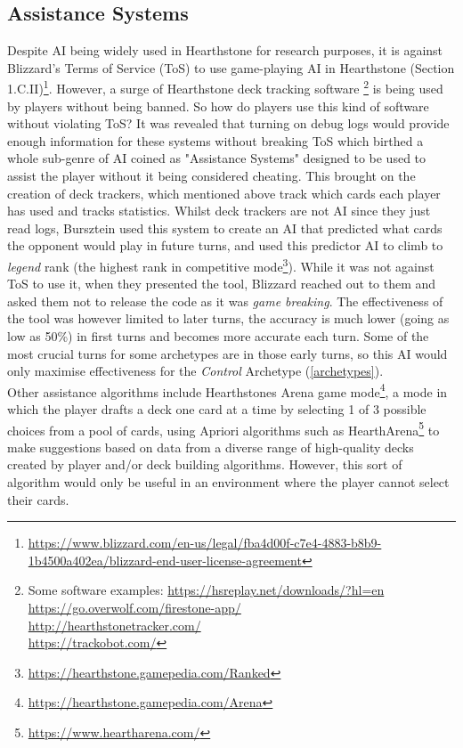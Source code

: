 \documentclass{report} %
\begin{document}
\subsection{Assistance Systems}
Despite AI being widely used in Hearthstone for research purposes, it is against Blizzard's Terms of Service (ToS) to use game-playing AI in Hearthstone (Section 1.C.II)\footnote{\url{https://www.blizzard.com/en-us/legal/fba4d00f-c7e4-4883-b8b9-1b4500a402ea/blizzard-end-user-license-agreement}}. However, a surge of Hearthstone deck tracking software \footnote{Some software examples: \url{https://hsreplay.net/downloads/?hl=en} \\ \url{https://go.overwolf.com/firestone-app/} \\ \url{http://hearthstonetracker.com/}  \\ \url{https://trackobot.com/}} is being used by players without being banned. So how do players use this kind of software without violating ToS? It was revealed that turning on debug logs would provide enough information for these systems without breaking ToS \cite{Flipperbw2014} which birthed a whole sub-genre of AI coined as "Assistance Systems" designed to be used to assist the player without it being considered cheating. This brought on the creation of deck trackers, which mentioned above track which cards each player has used and tracks statistics. Whilst deck trackers are not AI since they just read logs, Bursztein \cite{Bursztein2016} used this system to create an AI that predicted what cards the opponent would play in future turns, and used this predictor AI to climb to \textit{legend} rank (the highest rank in competitive mode\footnote{\url{https://hearthstone.gamepedia.com/Ranked}}). While it was not against ToS to use it, when they presented the tool, Blizzard reached out to them and asked them not to release the code as it was \textit{game breaking}. The effectiveness of the tool was however limited to later turns, the accuracy is much lower (going as low as 50\%) in first turns and becomes more accurate each turn. Some of the most crucial turns for some archetypes are in those early turns, so this AI would only maximise effectiveness for the \textit{Control} Archetype (\ref{archetypes}). \\
\indent Other assistance algorithms include Hearthstones Arena game mode\footnote{\url{https://hearthstone.gamepedia.com/Arena}}, a mode in which the player drafts a deck one card at a time by selecting 1 of 3 possible choices from a pool of cards, using Apriori algorithms \cite{Agrawal1994} such as HearthArena\footnote{\url{https://www.heartharena.com/}} to make suggestions based on data from a diverse range of high-quality decks created by player and/or deck building algorithms\cite{MapElites}. However, this sort of algorithm would only be useful in an environment where the player cannot select their cards. \\ 
\end{document}
